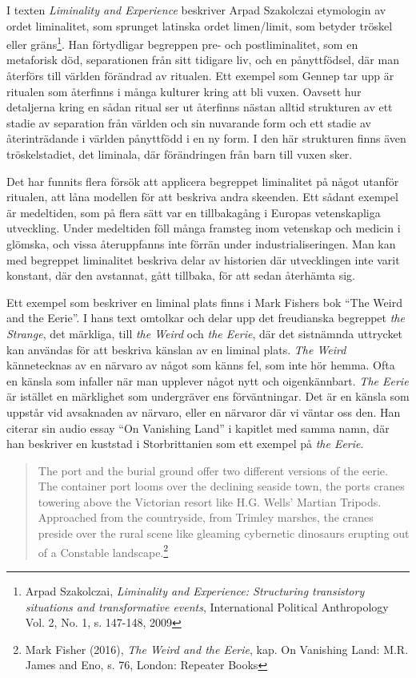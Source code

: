 \documentclass{article}
\begin{document}
I texten \emph{Liminality and Experience} beskriver Arpad Szakolczai etymologin av ordet liminalitet, som
sprunget latinska ordet limen/limit, som betyder tröskel eller gräns\footnote{Arpad Szakolczai,
\emph{Liminality and Experience: Structuring transistory situations and transformative events}, International
Political Anthropology Vol. 2, No. 1, s. 147-148, 2009}. Han förtydligar begreppen pre- och postliminalitet,
som en metaforisk död, separationen från sitt tidigare liv, och en pånyttfödsel, där man återförs till världen
förändrad av ritualen. Ett exempel som Gennep tar upp är ritualen som återfinns i många kulturer kring att bli
vuxen. Oavsett hur detaljerna kring en sådan ritual ser ut återfinns nästan alltid strukturen av ett stadie av
separation från världen och sin nuvarande form och ett stadie av återinträdande i världen pånyttfödd i en ny
form. I den här strukturen finns även tröskelstadiet, det liminala, där förändringen från barn till vuxen
sker. 

Det har funnits flera försök att applicera begreppet liminalitet på något utanför ritualen, att låna modellen
för att beskriva andra skeenden. Ett sådant exempel är medeltiden, som på flera sätt var en tillbakagång i
Europas vetenskapliga utveckling. Under medeltiden föll många framsteg inom vetenskap och medicin i glömska,
och vissa återuppfanns inte förrän under industrialiseringen. Man kan med begreppet liminalitet beskriva delar
av historien där utvecklingen inte varit konstant, där den avstannat, gått tillbaka, för att sedan återhämta
sig. 

Ett exempel som beskriver en liminal plats finns i Mark Fishers bok ``The Weird and the Eerie''. I hans text
omtolkar och delar upp det freudianska begreppet \emph{the Strange}, det märkliga, till \emph{the
Weird} och \emph{the Eerie}, där det sistnämnda uttrycket kan användas för att beskriva känslan av en liminal plats. 
\emph{The Weird} kännetecknas av en närvaro av något som känns fel, som inte hör hemma. Ofta en känsla som
infaller när man upplever något nytt och oigenkännbart. \emph{The Eerie} är istället en märklighet som undergräver ens
förväntningar. Det är en känsla som uppstår vid avsaknaden av närvaro, eller en närvaror där vi väntar oss
den. Han citerar sin audio essay ``On Vanishing Land'' i kapitlet med samma namn, där han beskriver en
kuststad i Storbrittanien som ett exempel på \emph{the Eerie}.

\begin{quote}
The port and the burial ground offer two different versions of the eerie. The container port looms over the
declining seaside town, the ports cranes towering above the Victorian resort like H.G. Wells' Martian Tripods.
Approached from the countryside, from Trimley marshes, the cranes preside over the rural scene like gleaming
cybernetic dinosaurs erupting out of a Constable landscape.\footnote{Mark Fisher (2016), \emph{The Weird and the
Eerie}, kap. On Vanishing Land: M.R. James and Eno, s. 76, London: Repeater Books}
\end{quote}
\end{document}
